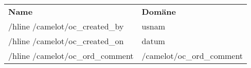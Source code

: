 \begin{tabu}{p{0.5\textwidth}p{0.45\textwidth }}
\rowfont{\bfseries\leavevmode\color{headingfont}}\textbf{Name} & \textbf{Domäne} \\
/hline
/camelot/oc\_created\_by & usnam \\
/hline
/camelot/oc\_created\_on & datum \\
/hline
/camelot/oc\_ord\_comment & /camelot/oc\_ord\_comment \\
\end{tabu}